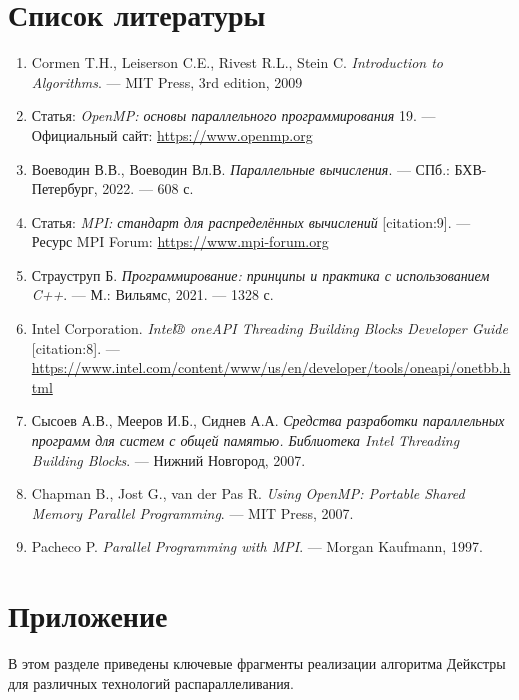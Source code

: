 \documentclass[12pt]{article}
\begin{document}
\section{Список литературы}
\begin{enumerate}
\item Cormen T.H., Leiserson C.E., Rivest R.L., Stein C. \textit{Introduction to Algorithms}. — MIT Press, 3rd edition, 2009
\item Статья: \textit{OpenMP: основы параллельного программирования} 19. — Официальный сайт: \url{https://www.openmp.org}
\item Воеводин В.В., Воеводин Вл.В. \textit{Параллельные вычисления}. — СПб.: БХВ-Петербург, 2022. — 608 с.
\item Статья: \textit{MPI: стандарт для распределённых вычислений} [citation:9]. — Ресурс MPI Forum: \url{https://www.mpi-forum.org}
\item Страуструп Б. \textit{Программирование: принципы и практика с использованием C++}. — М.: Вильямс, 2021. — 1328 с.
\item Intel Corporation. \textit{Intel® oneAPI Threading Building Blocks Developer Guide} [citation:8]. — \url{https://www.intel.com/content/www/us/en/developer/tools/oneapi/onetbb.html}
\item Сысоев А.В., Мееров И.Б., Сиднев А.А. \textit{Средства разработки параллельных программ для систем с общей памятью. Библиотека Intel Threading Building Blocks}. — Нижний Новгород, 2007.
\item Chapman B., Jost G., van der Pas R. \textit{Using OpenMP: Portable Shared Memory Parallel Programming}. — MIT Press, 2007.
\item Pacheco P. \textit{Parallel Programming with MPI}. — Morgan Kaufmann, 1997.
\end{enumerate}

\section*{Приложение}

\hspace*{1.25em}В этом разделе приведены ключевые фрагменты реализации алгоритма Дейкстры для различных технологий распараллеливания.
\end{document}
